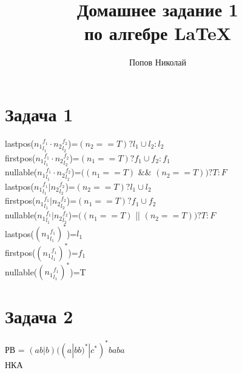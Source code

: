 \documentclass[a4paper,12pt]{article} %
\author{Попов Николай}
\title{Домашнее задание 1\\ по алгебре \LaTeX{}}
\begin{document}
 
\section*{Задача 1}
lastpos(${n_1}^{f_1}_{l_1}\cdot {n_2}^{f_2}_{l_2}$)=$(n_2 == T)?l_1\cup l_2:l_2$
\\
firstpos(${n_1}^{f_1}_{l_1}\cdot {n_2}^{f_2}_{l_2}$)=$(n_1 == T)?f_1\cup f_2:f_1$
\\
nullable(${n_1}^{f_1}_{l_1}\cdot {n_2}^{f_2}_{l_2}$)=$( (n_1 == T)$ \&\& $(n_2 == T))?T:F$\\

lastpos(${n_1}^{f_1}_{l_1} | {n_2}^{f_2}_{l_2}$)=$(n_2 == T)?l_1\cup l_2$
\\
firstpos(${n_1}^{f_1}_{l_1}| {n_2}^{f_2}_{l_2}$)=$(n_1 == T)?f_1\cup f_2$
\\
nullable(${n_1}^{f_1}_{l_1}| {n_2}^{f_2}_{l_2}$)=$( (n_1 == T)$ || $(n_2 == T))?T:F$\\

lastpos($({n_1}^{f_1}_{l_1})^*$)=$l_1$
\\
firstpos($({n_1}^{f_1}_{l_1})^*$)=$f_1$
\\
nullable($({n_1}^{f_1}_{l_1})^*$)=T\\


\section*{Задача 2}
РВ = $(ab|b)((a|bb)^*|c^*)^*baba$
\\
НКА
\end{document}
